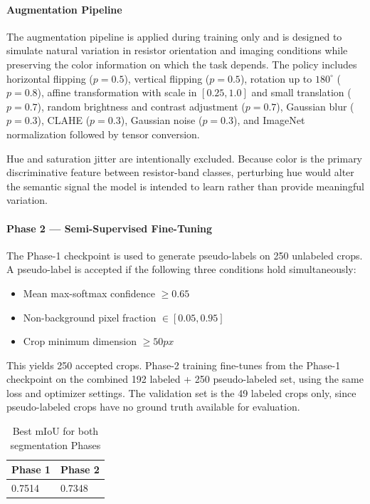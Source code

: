 \documentclass[conference]{IEEEtran}
\begin{document}
\paragraph{Augmentation Pipeline} 
The augmentation pipeline is applied during training only and is designed to simulate natural variation in resistor orientation and imaging conditions while preserving the color information on which the task depends. The policy includes horizontal flipping ($p=0.5$), vertical flipping ($p=0.5$), rotation up to $180^\circ$ ($p=0.8$), affine transformation with scale in $[0.25,1.0]$ and small translation ($p=0.7$), random brightness and contrast adjustment ($p=0.7$), Gaussian blur ($p=0.3$), CLAHE ($p=0.3$), Gaussian noise ($p=0.3$), and ImageNet normalization followed by tensor conversion.

Hue and saturation jitter are intentionally excluded. Because color is the primary discriminative feature between resistor-band classes, perturbing hue would alter the semantic signal the model is intended to learn rather than provide meaningful variation.

\paragraph{Phase 2 — Semi-Supervised Fine-Tuning} The Phase-1 checkpoint is used to generate pseudo-labels on 250 unlabeled crops. A pseudo-label is accepted if the following three conditions hold simultaneously:
\begin{itemize}
    \item Mean max-softmax confidence $\geq 0.65$
    \item Non-background pixel fraction $\in [0.05, 0.95]$
    \item Crop minimum dimension $\geq 50 px$
\end{itemize}

This yields 250 accepted crops. Phase-2 training fine-tunes from the Phase-1 checkpoint on the combined 192 labeled + 250 pseudo-labeled set, using the same loss and optimizer settings. The validation set is the 49 labeled crops only, since pseudo-labeled crops have no ground truth available for evaluation. 

\begin{table}[!t]
  \caption{Best mIoU for both segmentation Phases}
  \label{tab:3}
  \centering
  \renewcommand{\arraystretch}{1.15}
  \begin{tabular}{@{}ll@{}}
    \toprule
    \textbf{Phase 1} & \textbf{Phase 2}\\
    \midrule
    0.7514 & 0.7348 \\
    \midrule
  \end{tabular}
\end{table}
\end{document}
